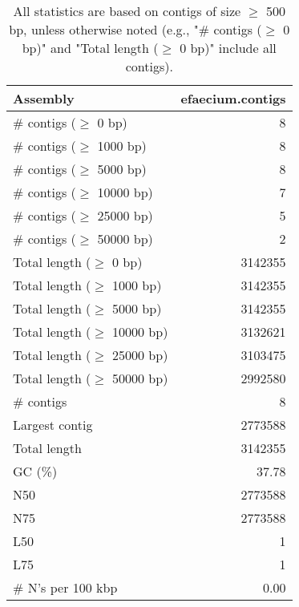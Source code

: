 \documentclass[12pt,a4paper]{article}
\begin{document}
\begin{table}[ht]
\begin{center}
\caption{All statistics are based on contigs of size $\geq$ 500 bp, unless otherwise noted (e.g., "\# contigs ($\geq$ 0 bp)" and "Total length ($\geq$ 0 bp)" include all contigs).}
\begin{tabular}{|l*{1}{|r}|}
\hline
Assembly & efaecium.contigs \\ \hline
\# contigs ($\geq$ 0 bp) & 8 \\ \hline
\# contigs ($\geq$ 1000 bp) & 8 \\ \hline
\# contigs ($\geq$ 5000 bp) & 8 \\ \hline
\# contigs ($\geq$ 10000 bp) & 7 \\ \hline
\# contigs ($\geq$ 25000 bp) & 5 \\ \hline
\# contigs ($\geq$ 50000 bp) & 2 \\ \hline
Total length ($\geq$ 0 bp) & 3142355 \\ \hline
Total length ($\geq$ 1000 bp) & 3142355 \\ \hline
Total length ($\geq$ 5000 bp) & 3142355 \\ \hline
Total length ($\geq$ 10000 bp) & 3132621 \\ \hline
Total length ($\geq$ 25000 bp) & 3103475 \\ \hline
Total length ($\geq$ 50000 bp) & 2992580 \\ \hline
\# contigs & 8 \\ \hline
Largest contig & 2773588 \\ \hline
Total length & 3142355 \\ \hline
GC (\%) & 37.78 \\ \hline
N50 & 2773588 \\ \hline
N75 & 2773588 \\ \hline
L50 & 1 \\ \hline
L75 & 1 \\ \hline
\# N's per 100 kbp & 0.00 \\ \hline
\end{tabular}
\end{center}
\end{table}
\end{document}

